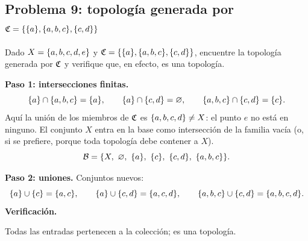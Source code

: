 \subsection{Problema 9: topología generada por \texorpdfstring{$\mathfrak{C}=\{\{a\},\{a,b,c\},\{c,d\}\}$}{C}}
\begin{enunciado}
Dado $X=\{a,b,c,d,e\}$ y $\mathfrak{C}=\{\{a\},\{a,b,c\},\{c,d\}\}$, encuentre la topología generada por $\mathfrak{C}$ y verifique que,
en efecto, es una topología.
\end{enunciado}
\textbf{Paso 1: intersecciones finitas.}
\[
\{a\}\cap\{a,b,c\}=\{a\},\qquad \{a\}\cap\{c,d\}=\varnothing,\qquad \{a,b,c\}\cap\{c,d\}=\{c\}.
\]
Aquí la unión de los miembros de $\mathfrak{C}$ es $\{a,b,c,d\}\neq X$: el punto $e$ no está en ninguno. El conjunto $X$ entra
en la base como intersección de la familia vacía (o, si se prefiere, porque toda topología debe contener a $X$).
\[\B=\{X,\ \vac,\ \s{a},\ \s{c},\ \s{c,d},\ \s{a,b,c}\}.\]

\textbf{Paso 2: uniones.} Conjuntos nuevos:
\[
\{a\}\cup\{c\}=\{a,c\},\qquad \{a\}\cup\{c,d\}=\{a,c,d\},\qquad \{a,b,c\}\cup\{c,d\}=\{a,b,c,d\}.
\]
\textbf{Verificación.}
\begin{center}{\scriptsize\renewcommand{\arraystretch}{1.2}\setlength{\tabcolsep}{3.5pt}}\end{center}
\begin{center}{\scriptsize\renewcommand{\arraystretch}{1.2}\setlength{\tabcolsep}{3.5pt}}\end{center}
Todas las entradas pertenecen a la colección; es una topología.

